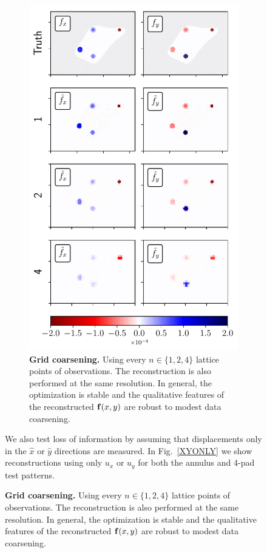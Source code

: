 \documentclass[aps,prl,reprint,twocolumn,groupedaddress,showpacs]{revtex4}
\def\f{{\bf f}}
\begin{document}
\begin{figure}
\begin{figure}
\includegraphics[width=\linewidth]{gridspacefig}
\caption{\textbf{Grid coarsening.} Using every $n\in\{1,2,4\}$
  lattice points of observations. The reconstruction is also performed
  at the same resolution.  In general, the optimization is stable and
  the qualitative features of the reconstructed $\f(x,y)$ are robust
  to modest data coarsening.}
\label{GRID}
\end{figure}

We also test loss of information by assuming that 
displacements only in the $\hat{x}$ or $\hat{y}$ directions 
are measured. In Fig.~\ref{XYONLY} we show reconstructions using only 
$u_{x}$ or $u_{y}$ for both the annulus and 4-pad test patterns.


\end{figure}
\end{document}

